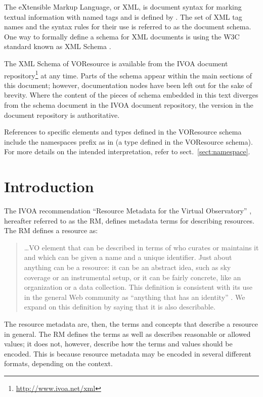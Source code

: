 \documentclass[11pt,a4paper]{ivoa}
\begin{document}
The eXtensible Markup Language, or XML, is document syntax for marking
textual information with named tags and is defined by \citet{std:XML}.
The set of XML tag names and the syntax
rules for their use is referred to as the document schema.  One way to
formally define a schema for XML documents is using the W3C standard
known as XML Schema \citep{std:XSD}.

The XML Schema of VOResource is
available from the IVOA document
repository\footnote{\url{http://www.ivoa.net/xml}} at any time.
Parts of the schema appear within the main sections of this document;
however, documentation nodes have been left out for the sake of brevity.
Where the content of the pieces of schema embedded in this text
diverges from the schema document in the IVOA document
repository, the version in the document repository is authoritative.

References to specific elements and types defined in the VOResource
schema include the namespaces prefix  as in
 (a type defined in the VOResource schema).  For more
details on the intended interpretation, refer to
sect.~\ref{sect:namespace}.

\section{Introduction}

The IVOA recommendation ``Resource Metadata for the Virtual
Observatory''
\citep{2007ivoa.spec.0302H}, hereafter referred to as the RM, defines
metadata terms for describing resources.  The RM defines a resource as: 

\begin{quotation}
\dots VO element that can be described in terms of who curates or
maintains it and which can be given a name and a unique identifier.
Just about anything can be a resource: it can be an abstract idea,
such as sky coverage or an instrumental setup, or it can be fairly
concrete, like an organization or a data collection.  This definition
is consistent with its use in the general Web community as
``anything that has an identity'' \citep{std:RFC3986}.  We
expand on this definition by saying that it is also describable.  
\end{quotation}

The resource metadata are, then, the terms and concepts that describe
a resource in general.  The RM defines the terms as well as describes
reasonable or allowed values; it does not, however, describe how the
terms and values should be encoded.  This is because resource metadata
may be encoded in several different formats, depending on the
context.
\end{document}
